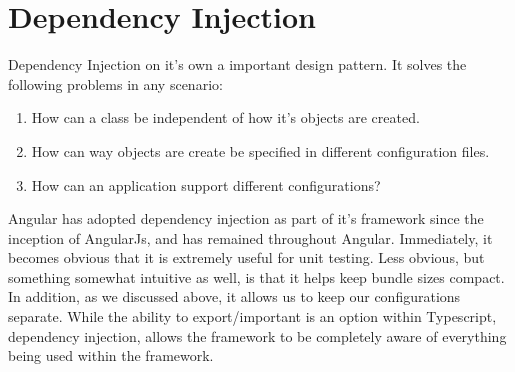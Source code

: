 \section{ Dependency Injection }
\maketitle{}

Dependency Injection on it's own a important design pattern. It solves the
following problems in any scenario:
\begin{enumerate}
  \item How can a class be independent of how it's objects are created.
  \item How can way objects are create be specified in different configuration
  files.
  \item How can an application support different configurations?
\end{enumerate}

Angular has adopted dependency injection as part of it's framework since the
inception of AngularJs, and has remained throughout Angular. Immediately, it
becomes obvious that it is extremely useful for unit testing. Less obvious, but
something somewhat intuitive as well, is that it helps keep bundle sizes
compact. In addition, as we discussed above, it allows us to keep our
configurations separate. While the ability to export/important is an option
within Typescript, dependency injection, allows the framework to be completely
aware of everything being used within the framework.
